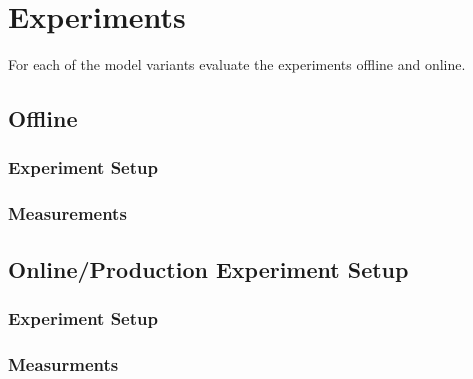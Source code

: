 \chapter{Experiments}
For each of the model variants evaluate the experiments offline and online.
\section{Offline}
\subsection{Experiment Setup}
\subsection{Measurements}

\section{Online/Production Experiment Setup}
\subsection{Experiment Setup}
\subsection{Measurments}